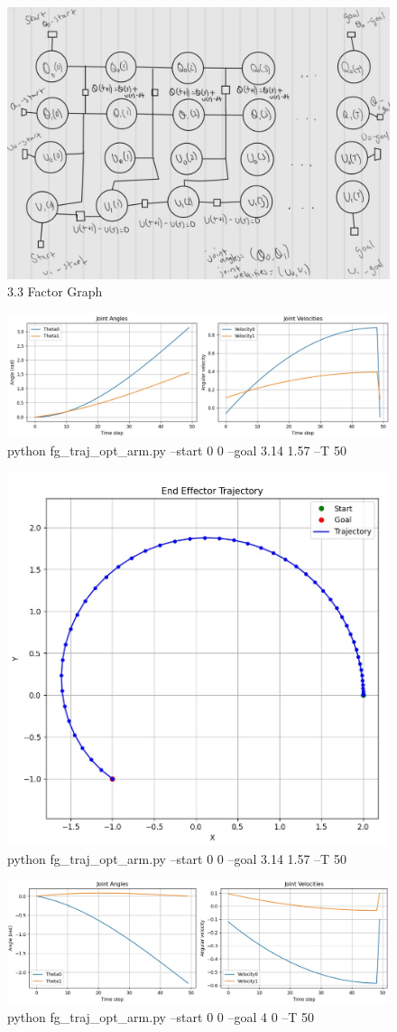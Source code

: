 \documentclass{article}
\begin{document}
\begin{figure} [H]
    \centering
    \includegraphics[width=0.5\linewidth]{latex_media/fg_traj_opt_arm_factorGraph.jpg}
    \caption{3.3 Factor Graph}
    \label{fig:enter-label}
\end{figure}

\begin{figure} [H]
    \centering
    \includegraphics[width=0.5\linewidth]{latex_media/fg_traj_opt_arm_1.jpg}
    \caption{python fg\_traj\_opt\_arm.py --start 0 0 --goal 3.14 1.57 --T 50}
    \label{fig:enter-label}
\end{figure}

\begin{figure} [H]
    \centering
    \includegraphics[width=0.5\linewidth]{latex_media/fg_traj_opt_arm_11.jpg}
    \caption{python fg\_traj\_opt\_arm.py --start 0 0 --goal 3.14 1.57 --T 50}
    \label{fig:enter-label}
\end{figure}

\begin{figure} [H]
    \centering
    \includegraphics[width=0.5\linewidth]{latex_media/fg_traj_opt_arm_2.jpg}
    \caption{python fg\_traj\_opt\_arm.py --start 0 0 --goal 4 0 --T 50}
    \label{fig:enter-label}
\end{figure}
\end{document}

